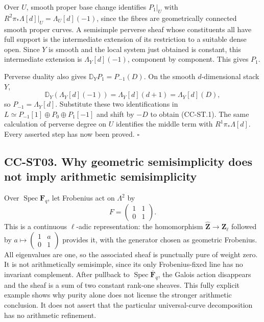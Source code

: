 Over \(U\), smooth proper base change identifies \(P_1|_U\) with
\(R^2\pi_*\Lambda[d]|_U=\Lambda_U[d](-1)\), since the fibres are
geometrically connected smooth proper curves. A semisimple perverse
sheaf whose constituents all have full support is the intermediate
extension of its restriction to a suitable dense open. Since \(Y\) is
smooth and the local system just obtained is constant, this intermediate
extension is \(\Lambda_Y[d](-1)\), component by component. This gives
\(P_1\).

Perverse duality also gives \(\mathbb D_YP_1=P_{-1}(D)\). On the smooth
\(d\)-dimensional stack \(Y\), \[
\mathbb D_Y(\Lambda_Y[d](-1))=\Lambda_Y[d](d+1)=\Lambda_Y[d](D),
\] so \(P_{-1}=\Lambda_Y[d]\). Substitute these two identifications in
\(L\simeq P_{-1}[1]\oplus P_0\oplus P_1[-1]\) and shift by \(-D\) to
obtain (CC-ST.1). The same calculation of perverse degree on \(U\)
identifies the middle term with \(R^1\pi_*\Lambda[d]\). Every asserted
step has now been proved. \(\square\)

\subsection{CC-ST03. Why geometric semisimplicity does not imply
arithmetic
semisimplicity}\label{cc-st03.-why-geometric-semisimplicity-does-not-imply-arithmetic-semisimplicity}

Over \(\operatorname{Spec}\mathbf F_q\), let Frobenius act on
\(\Lambda^2\) by \[
F=\begin{pmatrix}1&1\\0&1\end{pmatrix}.
\] This is a continuous \(\ell\)-adic representation: the homomorphism
\(\widehat{\mathbf Z}\to\mathbf Z_\ell\) followed by
\(a\mapsto\left(\begin{smallmatrix}1&a\\0&1\end{smallmatrix}\right)\)
provides it, with the generator chosen as geometric Frobenius. All
eigenvalues are one, so the associated sheaf is punctually pure of
weight zero. It is not arithmetically semisimple, since its only
Frobenius-fixed line has no invariant complement. After pullback to
\(\operatorname{Spec}\overline{\mathbf F}_q\), the Galois action
disappears and the sheaf is a sum of two constant rank-one sheaves. This
fully explicit example shows why purity alone does not license the
stronger arithmetic conclusion. It does not assert that the particular
universal-curve decomposition has no arithmetic refinement.

